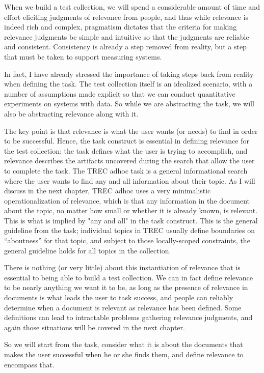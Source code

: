 \documentclass[nobib]{tufte-book}
\begin{document}
When we build a test collection, we will spend a considerable amount of time and effort eliciting judgments of relevance from people, and thus while relevance is indeed rich and complex, pragmatism dictates that the criteria for making relevance judgments be simple and intuitive so that the judgments are reliable and consistent.  Consistency is already a step removed from reality, but a step that must be taken to support measuring systems.

In fact, I have already stressed the importance of taking steps back from reality when defining the task.  The test collection itself is an idealized scenario, with a number of assumptions made explicit so that we can conduct quantitative experiments on systems with data.  So while we are abstracting the task, we will also be abstracting relevance along with it.

The key point is that relevance is what the user wants (or needs) to find in order to be successful.  Hence, the task construct is essential in defining relevance for the test collection: the task defines what the user is trying to accomplish, and relevance describes the artifacts uncovered during the search that allow the user to complete the task.  The TREC adhoc task is a general informational search where the user wants to find any and all information about their topic.  As I will discuss in the next chapter, TREC adhoc uses a very minimalistic operationalization of relevance, which is that any information in the document about the topic, no matter how small or whether it is already known, is relevant.  This is what is implied by "any and all" in the task construct.  This is the general guideline from the task; individual topics in TREC usually define boundaries on ``aboutness'' for that topic, and subject to those locally-scoped constraints, the general guideline holds for all topics in the collection.

There is nothing (or very little) about this instantiation of relevance that is essential to being able to build a test collection.  We can in fact define relevance to be nearly anything we want it to be, as long as the presence of relevance in documents is what leads the user to task success, and people can reliably determine when a document is relevant as relevance has been defined.  Some definitions can lead to intractable problems gathering relevance judgments, and again those situations will be covered in the next chapter.

So we will start from the task, consider what it is about the documents that makes the user successful when he or she finds them, and define relevance to encompass that.
\end{document}
